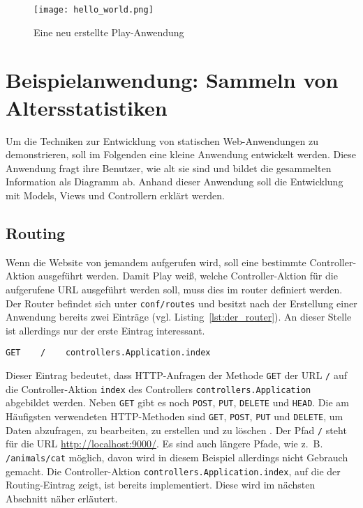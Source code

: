 \begin{figure}[h]
\centering
\texttt{[image: hello\_world.png]}
\caption{Eine neu erstellte Play-Anwendung}
\label{fig:anwendung_nach_erstellung}
\end{figure}



\section{Beispielanwendung: Sammeln von Altersstatistiken} %
\label{sec:beispielanwendung}

Um die Techniken zur Entwicklung von statischen Web-Anwendungen zu demonstrieren, soll im Folgenden eine kleine Anwendung entwickelt werden.
Diese Anwendung fragt ihre Benutzer, wie alt sie sind und bildet die gesammelten Information als Diagramm ab.
Anhand dieser Anwendung soll die Entwicklung mit Models, Views und Controllern erklärt werden.


\subsection{Routing} %
\label{sub:routing}

Wenn die Website von jemandem aufgerufen wird, soll eine bestimmte Controller-Aktion ausgeführt werden.
Damit Play weiß, welche Controller-Aktion für die aufgerufene URL ausgeführt werden soll, muss dies im \gls{router} definiert werden.
Der Router befindet sich unter \lstinline|conf/routes| und besitzt nach der Erstellung einer Anwendung bereits zwei Einträge (vgl. Listing~\ref{lst:der_router}).
An dieser Stelle ist allerdings nur der erste Eintrag interessant.

\begin{lstlisting}[caption=Der Router, label=lst:der_router]
  GET    /    controllers.Application.index
\end{lstlisting}

Dieser Eintrag bedeutet, dass HTTP-Anfragen der Methode \lstinline|GET| der URL \lstinline|/| auf die Controller-Aktion \lstinline|index| des Controllers \lstinline[breaklines=true]|controllers.Application| abgebildet werden.
Neben \lstinline|GET| gibt es noch \lstinline|POST|, \lstinline|PUT|, \lstinline|DELETE| und \lstinline|HEAD|.
Die am Häufigsten verwendeten HTTP-Methoden sind \lstinline|GET|, \lstinline|POST|, \lstinline|PUT| und \lstinline|DELETE|, um Daten abzufragen, zu bearbeiten, zu erstellen und zu löschen \cite[vgl.][S.~6]{play_for_scala_v8}.
Der Pfad \lstinline|/| steht für die URL \url{http://localhost:9000/}.
Es sind auch längere Pfade, wie z.~B. \lstinline|/animals/cat| möglich, davon wird in diesem Beispiel allerdings nicht Gebrauch gemacht.
Die Controller-Aktion \lstinline|controllers.Application.index|, auf die der Routing-Eintrag zeigt, ist bereits implementiert. Diese wird im nächsten Abschnitt näher erläutert.

